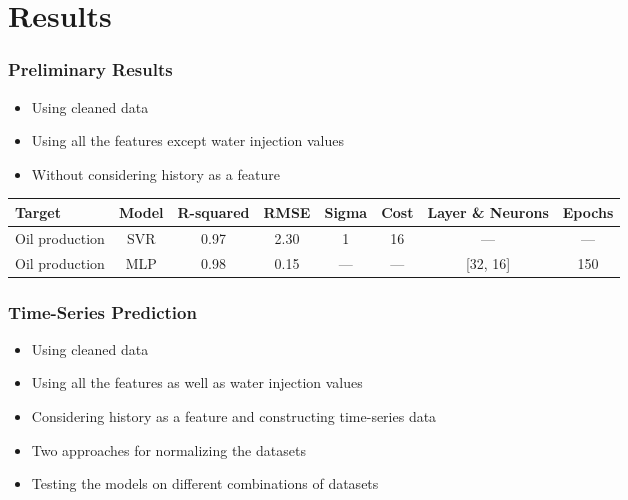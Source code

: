 \documentclass[xcolor=table]{beamer}
\begin{document}
\section{Results}
\begin{frame}
\frametitle{Preliminary Results}
\begin{itemize}
\item Using cleaned data
\item Using all the features except water injection values
\item Without considering history as a feature 
\end{itemize}

\begin{table}
\begin{adjustbox}{width=1\linewidth,center}
\label{tb:rs_adpt}
\begin{tabular}{lccccccc}
\toprule
\textbf{Target}&\textbf{Model}&\textbf{R-squared}&\textbf{RMSE}&\textbf{Sigma}&\textbf{Cost}&\textbf{Layer \& Neurons}&\textbf{Epochs}\tabularnewline
\midrule
Oil production & SVR &0.97 & 2.30 & 1 & 16 & ---&--- \tabularnewline
Oil production & MLP &\cellcolor{green!40}0.98  & 0.15 & --- & --- & [32, 16] & 150 \tabularnewline

\bottomrule
\end{tabular}
\end{adjustbox}
\end{table}

\end{frame}


\begin{frame}
\frametitle{Time-Series Prediction}
\begin{itemize}
\item Using cleaned data
\item Using all the features as well as water injection values
\item Considering history as a feature and constructing time-series data 
\item Two approaches for normalizing the datasets
\item Testing the models on different combinations of datasets
\end{itemize}


\end{frame}
\end{document}
